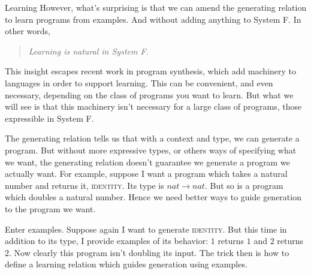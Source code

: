 \documentclass[11pt]{article}
\theoremstyle{mytheoremstyle}
\begin{document}
\begin{section}{Learning}
However, what's surprising is that we can amend the generating relation to learn programs from examples. And without adding anything to System F. In other words,
\begin{quote}
\centering
    \textit{Learning is natural in System F.}
\end{quote}

This insight escapes recent work in program synthesis, which add machinery to languages in order to support learning. This can be convenient, and even necessary, depending on the class of programs you want to learn. But what we will see is that this machinery isn't necessary for a large class of programs, those expressible in System F.

The generating relation tells us that with a context and type, we can generate a program. But without more expressive types, or others ways of specifying what we want, the generating relation doesn't guarantee we generate a program we actually want. For example, suppose I want a program which takes a natural number and returns it, \textsc{identity}. Its type is $nat \!\to\! nat$. But so is a program which doubles a natural number. Hence we need better ways to guide generation to the program we want. 

Enter examples. Suppose again I want to generate \textsc{identity}. But this time in addition to its type, I provide examples of its behavior: $1$ returns $1$ and $2$ returns $2$. Now clearly this program isn't doubling its input. The trick then is how to define a learning relation which guides generation using examples.


\end{section}
\end{document}
